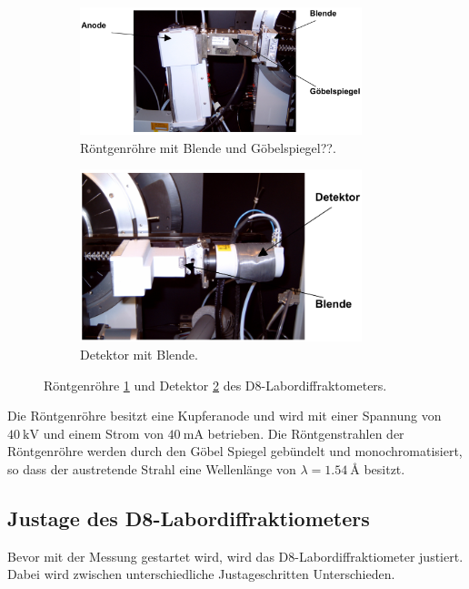 \begin{figure}
  \centering
  \begin{subfigure}{0.5\textwidth}
  \includegraphics[width=0.9\textwidth]{bilder/anode.PNG}
  \caption{Röntgenröhre mit Blende und Göbelspiegel??.}
  \label{fig:anode}
\end{subfigure}
\begin{subfigure}{0.5\textwidth}
\includegraphics[width=0.9\textwidth]{bilder/detektor.PNG}
\caption{Detektor mit Blende.}
\label{fig:det}
\end{subfigure}
\caption{Röntgenröhre \ref{fig:anode} und Detektor \ref{fig:det} des D8-Labordiffraktometers. \cite{sample}}
\label{fig:anode_det}
\end{figure}

Die Röntgenröhre besitzt eine Kupferanode und wird mit einer Spannung von $\SI{40}{\kilo\volt}$
und einem Strom von $\SI{40}{\milli\ampere}$ betrieben.
Die Röntgenstrahlen der Röntgenröhre werden durch den Göbel Spiegel
gebündelt und monochromatisiert,
so dass der austretende Strahl eine Wellenlänge von
$\lambda=\SI{1.54}{\angstrom}$ besitzt.


\subsection{Justage des D8-Labordiffraktiometers}
\label{subsec:justage}
Bevor mit der Messung gestartet wird, wird das D8-Labordiffraktiometer
justiert. Dabei wird zwischen unterschiedliche Justageschritten Unterschieden.


